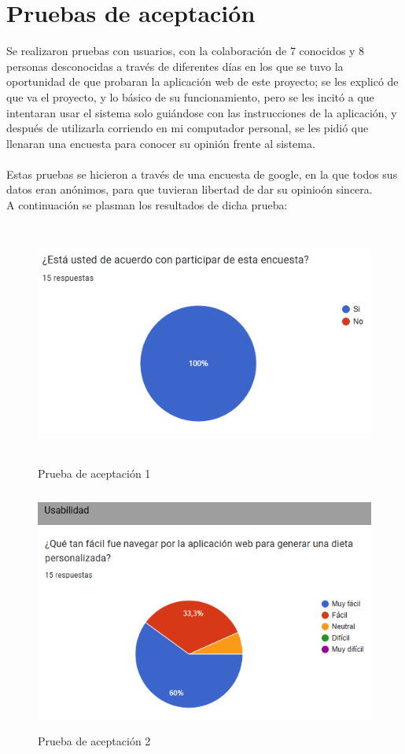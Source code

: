 \section{Pruebas de aceptaci\'on}
\noindent Se realizaron pruebas con usuarios, con la colaboraci\'on de 7 conocidos y 8 personas desconocidas a trav\'es de diferentes d\'ias en los que se tuvo la oportunidad de que probaran la aplicaci\'on web de este proyecto; se les explic\'o de que va el proyecto, y lo b\'asico de su funcionamiento, pero se les incit\'o a que intentaran usar el sistema solo gui\'andose con las instrucciones de la aplicaci\'on, y despu\'es de utilizarla corriendo en mi computador personal, se les pidi\'o que llenaran una encuesta para conocer su opini\'on frente al sistema.
\\
\\
Estas pruebas se hicieron a trav\'es de una encuesta de google, en la que todos sus datos eran an\'onimos, para que tuvieran libertad de dar  su opinio\'on sincera.
\\
A continuaci\'on se plasman los resultados de dicha prueba:

\begin{figure}[H]
    \centering
    \includegraphics[height=8cm]{img/validacion/aceptacion.png}
    \caption{Prueba de aceptaci\'on 1}
    \label{fig:aceptacion1}
\end{figure}

\begin{figure}[H]
    \centering
    \includegraphics[height=8cm]{img/validacion/aceptacion2.png}
    \caption{Prueba de aceptaci\'on 2}
    \label{fig:aceptacion2}
\end{figure}

